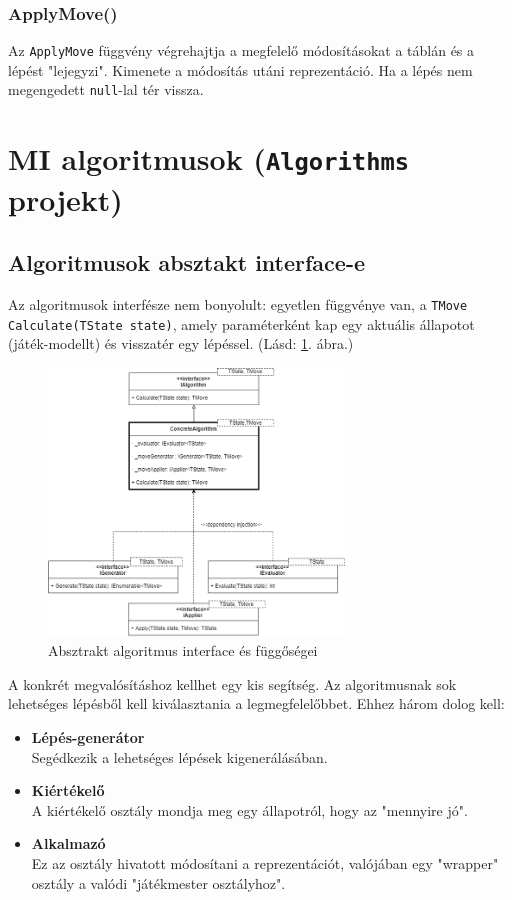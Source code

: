 \documentclass[twoside, a4paper, 12pt]{book}
\begin{document}
\subsubsection{ApplyMove()}
Az \texttt{ApplyMove} függvény végrehajtja a megfelelő módosításokat a táblán és a lépést "lejegyzi". Kimenete a módosítás utáni reprezentáció. Ha a lépés nem megengedett \texttt{null}-lal tér vissza.

\section{MI algoritmusok (\texttt{Algorithms} projekt)}
\subsection{Algoritmusok absztakt interface-e}
Az algoritmusok interfésze nem bonyolult: egyetlen függvénye van, a \texttt{TMove Calculate(TState state)}, amely paraméterként kap egy aktuális állapotot (játék-modellt) és visszatér egy lépéssel. (Lásd: \ref{fig:algorithmAbstractDiagram}. ábra.)

\begin{figure}[htbp]
	\centering
	\includegraphics[width=0.7\textwidth]{img/algorithmAbstractDiagram.png}
	\caption{Absztrakt algoritmus interface és függőségei}
	\label{fig:algorithmAbstractDiagram}
\end{figure}

A konkrét megvalósításhoz kellhet egy kis segítség. Az algoritmusnak sok lehetséges lépésből kell kiválasztania a legmegfelelőbbet. Ehhez három dolog kell:

\begin{itemize}
	\item \textbf{Lépés-generátor} \\
	Segédkezik a lehetséges lépések kigenerálásában.
	
	\item \textbf{Kiértékelő} \\
	A kiértékelő osztály mondja meg egy állapotról, hogy az "mennyire jó".

	\item \textbf{Alkalmazó} \\
	Ez az osztály hivatott módosítani a reprezentációt, valójában egy "wrapper" osztály a valódi "játékmester osztályhoz".
\end{itemize}
\end{document}
